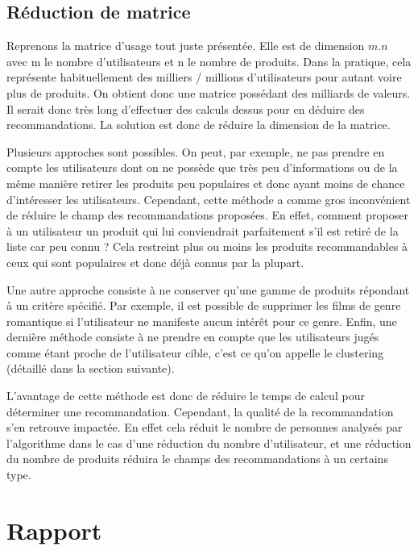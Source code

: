 \documentclass{report}
\begin{document}
\section{Réduction de matrice}
Reprenons la matrice d'usage tout juste présentée. Elle est de dimension $m.n$ avec m le nombre d'utilisateurs et n le nombre de produits. Dans la pratique, cela représente habituellement des milliers / millions d'utilisateurs pour autant voire plus de produits. On obtient donc une matrice possédant des milliards de valeurs. Il serait donc très long d'effectuer des calculs dessus pour en déduire des recommandations. La solution est donc de réduire la dimension de la matrice.
\vspace{0.5cm}

Plusieurs approches sont possibles. On peut, par exemple, ne pas prendre en compte les utilisateurs dont on ne possède que très peu d'informations ou de la même manière retirer les produits peu populaires et donc ayant moins de chance d'intéresser les utilisateurs. Cependant, cette méthode a comme gros inconvénient de réduire le champ des recommandations proposées. En effet, comment proposer à un utilisateur un produit qui lui conviendrait parfaitement s'il est retiré de la liste car peu connu ? Cela restreint plus ou moins les produits recommandables à ceux qui sont populaires et donc déjà connus par la plupart.\par
Une autre approche consiste à ne conserver qu'une gamme de produits répondant à un critère spécifié. Par exemple, il est possible de supprimer les films de genre romantique si l'utilisateur ne manifeste aucun intérêt pour ce genre. Enfin, une dernière méthode consiste à ne prendre en compte que les utilisateurs jugés comme étant proche de l'utilisateur cible, c'est ce qu'on appelle le clustering (détaillé dans la section suivante).\par
L'avantage de cette méthode est donc de réduire le temps de calcul pour déterminer une recommandation. Cependant, la qualité de la recommandation s'en retrouve impactée. En effet cela réduit le nombre de personnes analysés par l’algorithme dans le cas d’une réduction du nombre d’utilisateur, et une réduction du nombre de produits réduira le champs des recommandations à un certains type.






\chapter{Rapport}
\end{document}
